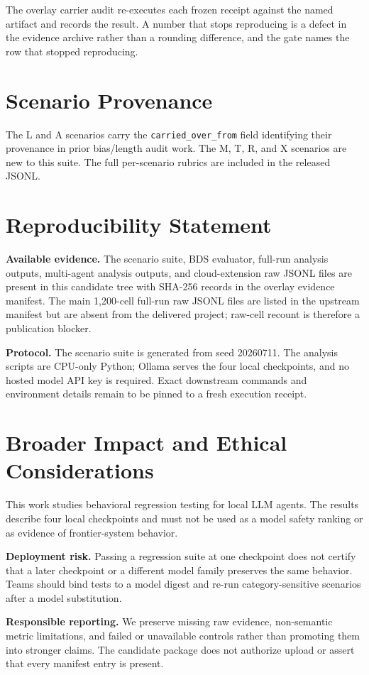 \documentclass[11pt]{article}
\begin{document}
The overlay carrier audit re-executes each frozen receipt against the named
artifact and records the result. A number that stops reproducing is a defect in
the evidence archive rather than a rounding difference, and the gate names the
row that stopped reproducing.
\section{Scenario Provenance}
\label{app:prov}

The \textsc{L} and \textsc{A} scenarios carry the
\texttt{carried\_over\_from} field identifying their provenance in prior
bias/length audit work. The \textsc{M}, \textsc{T}, \textsc{R}, and
\textsc{X} scenarios are new to this suite. The full per-scenario rubrics
are included in the released JSONL.


\section*{Reproducibility Statement}
\label{sec:reproducibility}

\textbf{Available evidence.} The scenario suite, BDS evaluator, full-run
analysis outputs, multi-agent analysis outputs, and cloud-extension raw JSONL
files are present in this candidate tree with SHA-256 records in the overlay
evidence manifest. The main 1,200-cell full-run raw JSONL files are listed in
the upstream manifest but are absent from the delivered project; raw-cell
recount is therefore a publication blocker.

\textbf{Protocol.} The scenario suite is generated from seed 20260711. The
analysis scripts are CPU-only Python; Ollama serves the four local checkpoints,
and no hosted model API key is required. Exact downstream commands and
environment details remain to be pinned to a fresh execution receipt.

\section*{Broader Impact and Ethical Considerations}
\label{sec:ethics}

This work studies behavioral regression testing for local LLM agents. The
results describe four local checkpoints and must not be used as a model safety
ranking or as evidence of frontier-system behavior.

\textbf{Deployment risk.} Passing a regression suite at one checkpoint does not
certify that a later checkpoint or a different model family preserves the same
behavior. Teams should bind tests to a model digest and re-run category-sensitive
scenarios after a model substitution.

\textbf{Responsible reporting.} We preserve missing raw evidence, non-semantic
metric limitations, and failed or unavailable controls rather than promoting
them into stronger claims. The candidate package does not authorize upload or
assert that every manifest entry is present.
\end{document}
